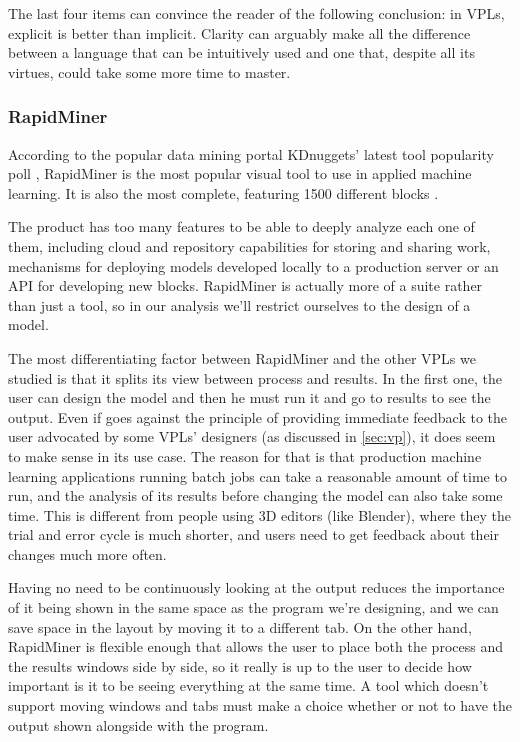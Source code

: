 The last four items can convince the reader of the following conclusion: in VPLs, explicit
is better than implicit. Clarity can arguably make all the
difference between a language that can be intuitively used and one that, despite
all its virtues, could take some more time to master.

\subsubsection{RapidMiner}

According to the popular data mining portal KDnuggets' latest tool popularity
poll \cite{kdn}, RapidMiner is the most popular visual tool to use in applied
machine learning. It is also the most complete, featuring 1500 different blocks \cite{rapidminer}.

The product has too many features to be able to deeply analyze each one of them,
including cloud and repository capabilities for storing and sharing work,
mechanisms for deploying models developed locally to a production server or
an API for developing new blocks. RapidMiner is actually more of a suite rather
than just a tool, so in our analysis we'll restrict ourselves to the design of
a model.

The most differentiating factor between RapidMiner and the other VPLs we studied
is that it splits its view between process and results. In the first one, the
user can design the model and then he must run it and go to results to see the output.
Even if goes against the principle of providing immediate feedback to the user
advocated by some VPLs' designers (as discussed in \ref{sec:vp}), it does seem to make
sense in its use case. The reason for that is that production machine learning applications
running batch jobs can take a reasonable amount of time to run, and the analysis
of its results before changing the model can also take some time. This is
different from people using 3D editors (like Blender), where they the trial and
error cycle is much shorter, and users need to get feedback about their changes
much more often.

Having no need to be continuously looking at the output reduces the importance
of it being shown in the same space as the program we're designing, and we can
save space in the layout by moving it to a different tab. On the other hand,
RapidMiner is flexible enough that allows the user to place both the process
and the results windows side by side, so it really is up to the user to decide
how important is it to be seeing everything at the same time. A tool which doesn't
support moving windows and tabs must make a choice whether or not to have the
output shown alongside with the program.

